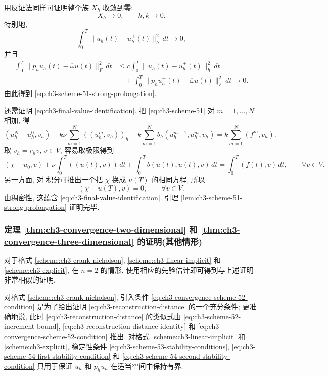 {{\begin{Proof}
用反证法同样可证明整个族 $X_h$ 收敛到零:
\[
X_h\to0,
\qquad h,k\to0.
\]
特别地,
\[
\int_0^T\lVert u_h(t)-u_h^+(t)\rVert_h^2\,dt\to0,
\]
并且
\begin{align*}
\int_0^T\lVert p_hu_h(t)-\overline\omega u(t)\rVert_F^2\,dt
&\leq c\int_0^T\lVert u_h(t)-u_h^+(t)\rVert_h^2\,dt\\
&\quad+\int_0^T\lVert p_hu_h^+(t)-\overline\omega u(t)\rVert_F^2\,dt
\longrightarrow0.
\end{align*}
由此得到 \eqref{eq:ch3-scheme-51-strong-prolongation}.

还需证明 \eqref{eq:ch3-final-value-identification}. 把 \eqref{eq:ch3-scheme-51} 对 $m=1,\ldots,N$ 相加, 得
\[
(u_h^N-u_h^0,v_h)+k\nu\sum_{m=1}^N((u_h^m,v_h))_h
+k\sum_{m=1}^Nb_h(u_h^{m-1},u_h^m,v_h)
=k\sum_{m=1}^N(f^m,v_h).
\]
取 $v_h=r_hv$, $v\in V$, 容易取极限得到
\[
(\chi-u_0,v)+\nu\int_0^T((u(t),v))\,dt
+\int_0^Tb(u(t),u(t),v)\,dt
=\int_0^T(f(t),v)\,dt,
\qquad\forall v\in V.
\]
\hypertarget{chapter-03-page-261-section-05}{}
另一方面, 对  积分可推出一个把 $\chi$ 换成 $u(T)$ 的相同方程, 所以
\[
(\chi-u(T),v)=0,
\qquad\forall v\in V.
\]
由稠密性, 这蕴含 \eqref{eq:ch3-final-value-identification}. 引理 \ref{lem:ch3-scheme-51-strong-prolongation} 证明完毕.
\end{Proof}

\subsubsection{定理 \ref{thm:ch3-convergence-two-dimensional} 和 \ref{thm:ch3-convergence-three-dimensional} 的证明(其他情形)}
\label{subsubsec:ch3-proof-convergence-other-cases}

对于格式 \ref{scheme:ch3-crank-nicholson}, \ref{scheme:ch3-linear-implicit} 和 \ref{scheme:ch3-explicit}, 在 $n=2$ 的情形, 使用相应的先验估计即可得到与上述证明非常相似的证明.

对格式 \ref{scheme:ch3-crank-nicholson}, 引入条件 \eqref{eq:ch3-convergence-scheme-52-condition} 是为了给出证明 \eqref{eq:ch3-reconstruction-distance} 的一个充分条件; 更准确地说, 此时 \eqref{eq:ch3-reconstruction-distance} 的类似式由 \eqref{eq:ch3-scheme-52-increment-bound}, \eqref{eq:ch3-reconstruction-distance-identity} 和 \eqref{eq:ch3-convergence-scheme-52-condition} 推出. 对格式 \ref{scheme:ch3-linear-implicit} 和 \ref{scheme:ch3-explicit}, 稳定性条件 \eqref{eq:ch3-scheme-53-stability-conditions}, \eqref{eq:ch3-scheme-54-first-stability-condition} 和 \eqref{eq:ch3-scheme-54-second-stability-condition} 只用于保证 $u_h$ 和 $p_hu_h$ 在适当空间中保持有界.

}}
